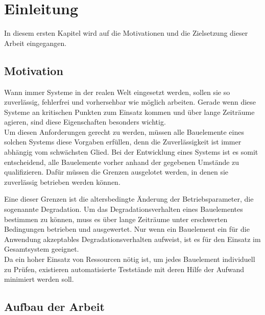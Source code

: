 
\chapter{Einleitung}
\label{chapter_einleitung}
In diesem ersten Kapitel wird auf die Motivationen und die Zielsetzung dieser Arbeit eingegangen.

\section{Motivation}
Wann immer Systeme in der realen Welt eingesetzt werden, sollen sie so zuverlässig, fehlerfrei und vorhersehbar wie möglich arbeiten. Gerade wenn diese Systeme an kritischen Punkten zum Einsatz kommen und über lange Zeiträume agieren, sind diese Eigenschaften besonders wichtig.\\
Um diesen Anforderungen gerecht zu werden, müssen alle Bauelemente eines solchen Systems diese Vorgaben erfüllen, denn die Zuverlässigkeit ist immer abhängig vom schwächsten Glied.
Bei der Entwicklung eines Systems ist es somit entscheidend, alle Bauelemente vorher anhand der gegebenen Umstände zu qualifizieren. Dafür müssen die Grenzen ausgelotet werden, in denen sie zuverlässig betrieben werden können.

Eine dieser Grenzen ist die altersbedingte Änderung der Betriebsparameter, die sogenannte Degradation.
Um das Degradationsverhalten eines Bauelementes bestimmen zu können, muss es über lange Zeiträume unter erschwerten Bedingungen betrieben und ausgewertet. Nur wenn ein Bauelement ein für die Anwendung akzeptables Degradationsverhalten aufweist, ist es für den Einsatz im Gesamtsystem geeignet.\\
Da ein hoher Einsatz von Ressourcen nötig ist, um jedes Bauelement individuell zu Prüfen, existieren automatisierte Teststände mit deren Hilfe der Aufwand minimiert werden soll.
 

\section{Aufbau der Arbeit}
